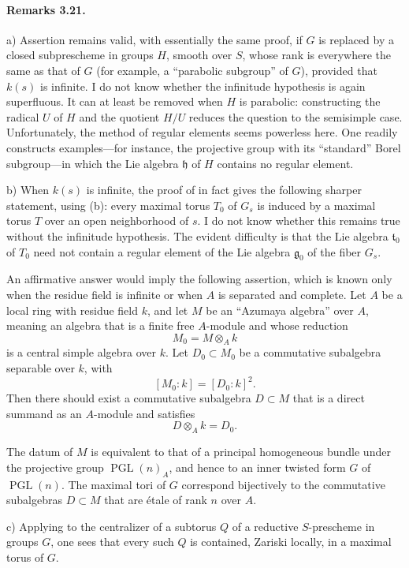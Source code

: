 \paragraph{\textbf{Remarks 3.21.}}
\textup{a)}
Assertion  remains valid, with essentially the same proof, if
\(G\) is replaced by a closed subprescheme in groups \(H\), smooth
over \(S\), whose rank is everywhere the same as that of \(G\)
\textup{(for example, a ``parabolic subgroup'' of \(G\))}, provided
that \(k(s)\) is infinite. I do not know whether the infinitude
hypothesis is again superfluous. It can at least be removed when
\(H\) is parabolic: constructing the radical \(U\) of \(H\) and
the quotient \(H/U\) reduces the question to the semisimple case.
Unfortunately, the method of regular elements seems powerless
here. One readily constructs examples---for instance, the
projective group with its ``standard'' Borel subgroup---in which
the Lie algebra \(\mathfrak h\) of \(H\) contains no regular
element.

\smallskip
\noindent
\textup{b)}
When \(k(s)\) is infinite, the proof of  in fact gives the
following sharper statement, using \textup{(b)}: every maximal
torus \(T_0\) of \(G_s\) is induced by a maximal torus \(T\) over
an open neighborhood of \(s\). I do not know whether this remains
true without the infinitude hypothesis. The evident difficulty is
that the Lie algebra \(\mathfrak t_0\) of \(T_0\) need not contain
a regular element of the Lie algebra \(\mathfrak g_0\) of the
fiber \(G_s\).

An affirmative answer would imply the following assertion, which
is known only when the residue field is infinite or when \(A\) is
separated and complete. Let \(A\) be a local ring with residue
field \(k\), and let \(M\) be an ``Azumaya algebra'' over \(A\),
meaning an algebra that is a finite free \(A\)-module and whose
reduction
\[
  M_0=M\otimes_A k
\]
is a central simple algebra over \(k\). Let \(D_0\subset M_0\) be
a commutative subalgebra separable over \(k\), with
\[
  [M_0:k]=[D_0:k]^2.
\]
Then there should exist a commutative subalgebra \(D\subset M\)
that is a direct summand as an \(A\)-module and satisfies
\[
  D\otimes_A k=D_0.
\]

The datum of \(M\) is equivalent to that of a principal homogeneous
bundle under the projective group \(\operatorname{PGL}(n)_A\), and
hence to an inner twisted form \(G\) of \(\operatorname{PGL}(n)\).
The maximal tori of \(G\) correspond bijectively to the commutative
subalgebras \(D\subset M\) that are étale of rank \(n\) over \(A\).

\smallskip
\noindent
\textup{c)}
Applying  to the centralizer of a subtorus \(Q\) of a reductive
\(S\)-prescheme in groups \(G\), one sees that every such \(Q\) is
contained, Zariski locally, in a maximal torus of \(G\).
